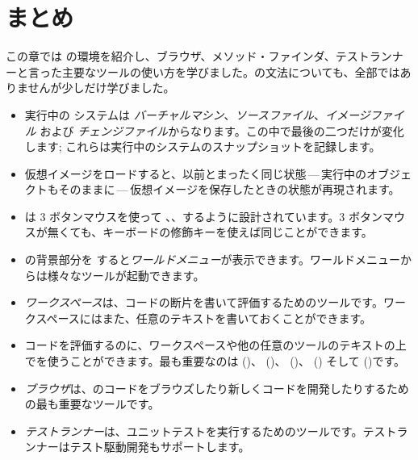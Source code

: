 \documentclass[a4paper,10pt,twoside]{book}
\begin{document}
\section{まとめ}
この章では \pharo の環境を紹介し、ブラウザ、メソッド・ファインダ、テストランナーと言った主要なツールの使い方を学びました。\pharo の文法についても、全部ではありませんが少しだけ学びました。

\begin{itemize}
  \item 実行中の \pharo システムは \emph{バーチャルマシン}、\emph{ソースファイル}、\emph{イメージファイル} および \emph{チェンジファイル}からなります。この中で最後の二つだけが変化します; これらは実行中のシステムのスナップショットを記録します。
  \item \pharo 仮想イメージをロードすると、以前とまったく同じ状態\,---\,実行中のオブジェクトもそのままに\,---\,仮想イメージを保存したときの状態が再現されます。
  \item \pharo は 3 ボタンマウスを使って \click、\actclick、\metaclick するように設計されています。3 ボタンマウスが無くても、キーボードの修飾キーを使えば同じことができます。
  \item \pharo の背景部分を \click すると\emph{ワールドメニュー}が表示できます。ワールドメニューからは様々なツールが起動できます。
  \item \emph{ワークスペース}は、コードの断片を書いて評価するためのツールです。ワークスペースにはまた、任意のテキストを書いておくことができます。
  \item コードを評価するのに、ワークスペースや他の任意のツールのテキストの上でを使うことができます。最も重要なのは  ()、 ()、 ()、 () そして  ()です。
  \item \emph{ブラウザ}は、\pharo のコードをブラウズしたり新しくコードを開発したりするための最も重要なツールです。
  \item \emph{テストランナー}は、ユニットテストを実行するためのツールです。テストランナーはテスト駆動開発もサポートします。
\end{itemize}

\ifx\wholebook\relax\else 
   
   
\end{document}
